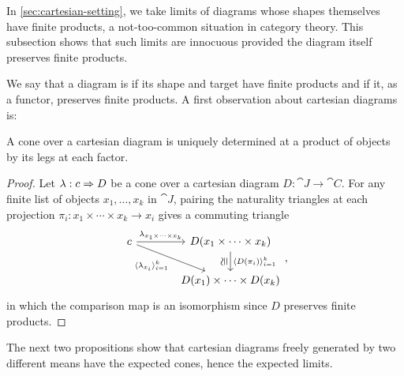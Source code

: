 \documentclass[11pt]{article}
\numberwithin{equation}{section}
\begin{document}
In \cref{sec:cartesian-setting}, we take limits of diagrams whose shapes
themselves have finite products, a not-too-common situation in category theory.
This subsection shows that such limits are innocuous provided the diagram itself
preserves finite products.

We say that a diagram is  if its shape and target have finite
products and if it, as a functor, preserves finite products. A first observation
about cartesian diagrams is:

\begin{lemma}
  \label{lem:cones-cartesian-diagram}
  A cone over a cartesian diagram is uniquely determined at a product of objects
  by its legs at each factor.
\end{lemma}
\begin{proof}
  Let $\lambda: c \Rightarrow D$ be a cone over a cartesian diagram $D: \cat{J} \to \cat{C}$.
  For any finite list of objects $x_1, \dots, x_k$ in $\cat{J}$, pairing the
  naturality triangles at each projection $\pi_i: x_1 \times \cdots \times x_k \to x_i$ gives a
  commuting triangle
  \begin{equation*}
    \begin{tikzcd}[column sep=large]
      c & {D(x_1 \times \cdots \times x_k)} \\
      & {D(x_1) \times \cdots \times D(x_k)}
      \arrow["{\lambda_{x_1 \times \cdots \times x_k}}", from=1-1, to=1-2]
      \arrow["{\langle \lambda_{x_i} \rangle_{i=1}^k}"', from=1-1, to=2-2]
      \arrow["{\langle D(\pi_i) \rangle_{i=1}^k}", from=1-2, to=2-2]
      \arrow["\cong"{marking, allow upside down}, shift left=2, draw=none, from=2-2, to=1-2]
    \end{tikzcd},
  \end{equation*}
  in which the comparison map is an isomorphism since $D$ preserves finite
  products.
\end{proof}

The next two propositions show that cartesian diagrams freely generated by two
different means have the expected cones, hence the expected limits.
\end{document}
